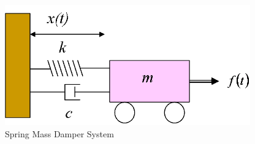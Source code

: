 \documentclass[aspectratio=169]{beamer}
\begin{document}
\begin{frame}
\begin{columns}
\begin{column}{0.5 \textwidth}
		\end{column}
		\begin{column}{0.375 \textwidth}
			\onslide<1->
			\begin{figure}
				\includegraphics[width=\textwidth]{Images/SpringMassDamper_cartSystem.png}
				Spring Mass Damper System \cite{ctms_engin_umich_SystemModeling}
			\end{figure}
		\end{column}
	\end{columns}
\end{frame}
\end{document}
